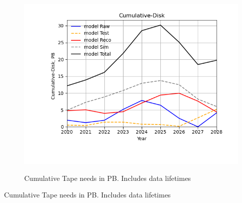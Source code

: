 \documentclass[12pt,landscape]{article}
\begin{document}
\begin{figure}[ht]
\centering\includegraphics[height=0.4\textwidth]{report/Parameters_2022-11-07-2028-Cumulative-Disk.png}\label{Cumulative-Disk}
\caption{Cumulative Tape needs in PB. Includes data lifetimes}
\end{figure}
\begin{table}[h]
\centering{}\label{Cumulative-Disk
}
\caption{Cumulative Tape needs in PB. Includes data lifetimes}
\end{table}

\end{document}
